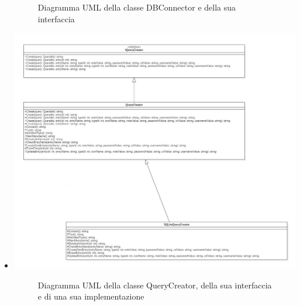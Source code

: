 \documentclass[a4paper,10pt]{report}
\begin{document}
\begin{itemize}
{\begin{center}
						\end{center}
					\begin{figure}[!h]
							\caption{Diagramma UML della classe DBConnector e della sua interfaccia}
						\end{figure}}
				\item[] {
					\begin{center}
						\includegraphics[width=\textwidth]{immagini/QueryCreator.jpg}
						\end{center}
					\begin{figure}[!h]
						\caption{Diagramma UML della classe QueryCreator, della sua interfaccia e di una sua implementazione}
						\end{figure}}
				\end{itemize}
		\newpage
\end{document}
